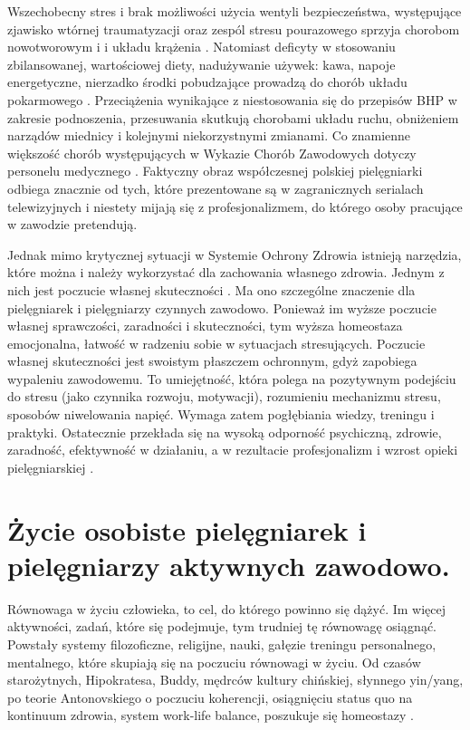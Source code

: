 \documentclass[a4paper,12pt,twoside,openany]{report}
\begin{document}
Wszechobecny stres i brak możliwości użycia wentyli bezpieczeństwa, występujące zjawisko wtórnej traumatyzacji oraz zespól stresu pourazowego sprzyja chorobom nowotworowym i i układu krążenia \cite{skutki}. Natomiast deficyty w stosowaniu zbilansowanej, wartościowej diety, nadużywanie używek: kawa, napoje energetyczne, nierzadko środki pobudzające prowadzą do chorób układu pokarmowego \cite{p.p}. Przeciążenia wynikające z niestosowania się do przepisów BHP w zakresie podnoszenia, przesuwania skutkują chorobami układu ruchu, obniżeniem narządów miednicy i kolejnymi niekorzystnymi zmianami. Co znamienne większość chorób występujących w Wykazie Chorób Zawodowych dotyczy personelu medycznego \cite{wykaz}. Faktyczny obraz współczesnej polskiej pielęgniarki odbiega znacznie od tych, które prezentowane są w zagranicznych serialach telewizyjnych i niestety mijają się z profesjonalizmem, do którego osoby pracujące w zawodzie pretendują.

Jednak mimo krytycznej sytuacji w Systemie Ochrony Zdrowia istnieją narzędzia, które można i należy wykorzystać dla zachowania własnego zdrowia. Jednym z nich jest poczucie własnej skuteczności \cite{skuteczność}. Ma ono szczególne znaczenie dla pielęgniarek i pielęgniarzy czynnych zawodowo. Ponieważ im wyższe poczucie własnej sprawczości, zaradności i skuteczności, tym wyższa homeostaza emocjonalna, łatwość w radzeniu sobie w sytuacjach stresujących\cite{salutogeneza}. Poczucie własnej skuteczności jest swoistym płaszczem ochronnym, gdyż zapobiega wypaleniu zawodowemu. To umiejętność, która polega na pozytywnym podejściu do stresu (jako czynnika rozwoju, motywacji), rozumieniu mechanizmu stresu, sposobów niwelowania napięć. Wymaga zatem pogłębiania wiedzy, treningu i praktyki. Ostatecznie przekłada się na wysoką odporność psychiczną, zdrowie, zaradność, efektywność w działaniu, a w rezultacie profesjonalizm i wzrost opieki pielęgniarskiej \cite{stres}.

\section{Życie osobiste pielęgniarek i pielęgniarzy aktywnych zawodowo.}
\label{sectionZycieOsobiste}
Równowaga w życiu człowieka, to cel, do którego powinno się dążyć. Im więcej aktywności, zadań, które się podejmuje, tym trudniej tę równowagę osiągnąć. Powstały systemy filozoficzne, religijne, nauki, gałęzie treningu personalnego, mentalnego, które skupiają się na poczuciu równowagi w życiu. Od czasów starożytnych, Hipokratesa, Buddy, mędrców kultury chińskiej, słynnego yin/yang, po teorie Antonovskiego o poczuciu koherencji, osiągnięciu status quo na kontinuum zdrowia, system work-life balance, poszukuje się homeostazy \cite{salutogeneza}.
\end{document}
